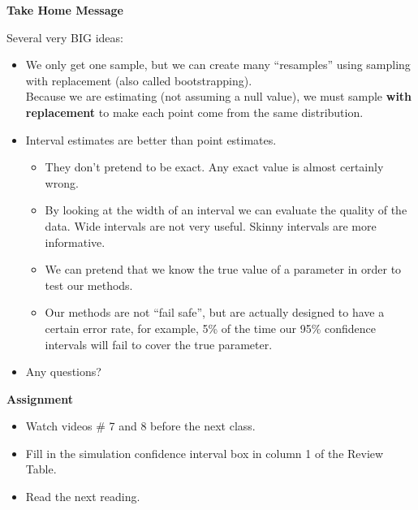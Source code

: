 \begin{center}
  {\large \bf Take Home Message} \vspace{-.5cm}
\end{center}

Several very BIG ideas:\vspace{-.8cm}
\begin{itemize}
\item We only get one sample, but we can create many ``resamples''
  using sampling with replacement (also called bootstrapping).\\
  Because we are estimating (not assuming a null value), we must
  sample {\bf with replacement} to make each point come from the same
  distribution.  

\item Interval estimates are better than point estimates.
  \begin{itemize}
  \item They don't pretend to be exact. Any exact value is almost
    certainly wrong.
  \item By looking at the width of an interval we can evaluate the
    quality of the data.  Wide intervals are not very useful.  Skinny
    intervals are more informative.
  \item We can pretend that we know the true value of a parameter in
    order to test our methods.
  \item Our methods are not ``fail safe'', but are actually designed
    to have a certain error rate, for example, 5\% of the time our
    95\% confidence intervals will fail to cover the true parameter.
  \end{itemize}
 \item 
  Any questions? \vfill
\end{itemize}


\noindent
{\bf Assignment}\vspace{-.5cm}
\begin{itemize}
 \item Watch videos  \# 7 and 8  before the next class.
\item Fill in the simulation confidence interval box in column 1 of
  the Review Table.

\item Read  the  next reading.
\end{itemize}






